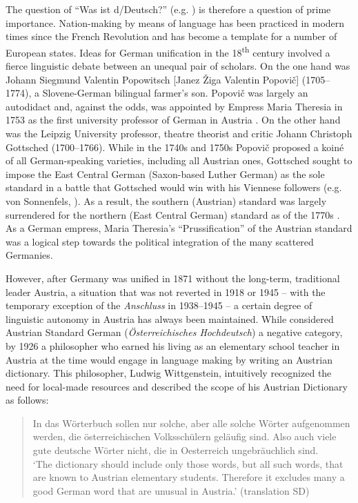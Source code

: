 \documentclass[output=paper]{langscibook}
\begin{document}
  The question of “Was ist d/Deutsch?” (e.g. \citealt{Maas2018}) is therefore a question of prime importance. Nation-making by means of language has been practiced in modern times since the French Revolution \citep{Coulmas1985} and has become a template for a number of European states. Ideas for German unification in the 18\textsuperscript{th} century involved a fierce linguistic debate between an unequal pair of scholars. On the one hand was Johann Siegmund Valentin Popowitsch [Janez Žiga Valentin Popovič] (1705--1774), a Slovene-German bilingual farmer’s son. Popovič was largely an autodidact and, against the odds, was appointed by Empress Maria Theresia in 1753 as the first university professor of German in Austria \citep{Faninger1996}. On the other hand was the Leipzig University professor, theatre theorist and critic Johann Christoph Gottsched (1700--1766). While in the 1740s and 1750s Popovič proposed a koiné of all German-speaking varieties, including all Austrian ones, Gottsched sought to impose the East Central German (Saxon-based Luther German) as the sole standard in a battle that Gottsched would win with his Viennese followers (e.g. von Sonnenfels, \citealt{Waldner2024}). As a result, the southern (Austrian) standard was largely surrendered for the northern (East Central German) standard as of the 1770s \citep{Havinga2018}. As a German empress, Maria Theresia’s “Prussification” of the Austrian standard was a logical step towards the political integration of the many scattered Germanies.

However, after Germany was unified in 1871 without the long-term, traditional leader Austria, a situation that was not reverted in 1918 or 1945 – with the temporary exception of the \textit{Anschluss} in 1938--1945 – a certain degree of linguistic autonomy in Austria has always been maintained. While \citet{Lewi1875} considered Austrian Standard German (\emph{Österreichisches Hochdeutsch}) a negative category, by 1926 a philosopher who earned his living as an elementary school teacher in Austria at the time would engage in language making by writing an Austrian dictionary. This philosopher, Ludwig Wittgenstein, intuitively recognized the need for local-made resources and described the scope of his Austrian Dictionary \citep{Wittgenstein1926} as follows:

\begin{quote}
\foreignlanguage{ngerman}{%
In das Wörterbuch sollen nur solche, aber alle solche Wörter aufgenommen werden, die österreichischen Volksschülern geläufig sind. Also auch viele gute deutsche Wörter nicht, die in Oesterreich ungebräuchlich sind. \citep[3]{Wittgenstein1925}}\medskip\\
`The dictionary should include only those words, but all such words, that are known to Austrian elementary students. Therefore it excludes many a good German word that are unusual in Austria.' (translation SD)
\end{quote}
\end{document}

